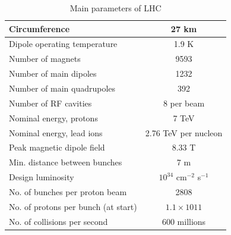 \begin{table}[h]
  \begin{center}
  \caption{ Main parameters of LHC \cite{ref_LHC_brochure}}
  \vspace{5 mm}
  \begin{tabular}{|l|c|}
     \hline
     Circumference & 27 km  \\ \hline
     Dipole operating temperature &  1.9 K \\ \hline
     Number of magnets &  9593 \\ \hline
     Number of main dipoles &  1232 \\ \hline
     Number of main quadrupoles &  392 \\ \hline
     Number of RF cavities &  8 per beam \\ \hline
     Nominal energy, protons &  7 TeV \\ \hline
     Nominal energy, lead ions &  2.76 TeV per nucleon \\ \hline
     Peak magnetic dipole field &  8.33 T \\ \hline
     Min. distance between bunches &  7 m \\ \hline
     Design luminosity &  $10^{34}$ cm$^{-2}$ s$^{-1}$ \\ \hline
     No. of bunches per proton beam &  2808 \\ \hline
     No. of protons per bunch (at start) &  $1.1\times 10{11}$ \\ \hline
     No. of collisions per second &  600 millions \\ \hline
  \end{tabular}
  \label{tab:LHCparameters}
  \end{center}
 \end{table}


